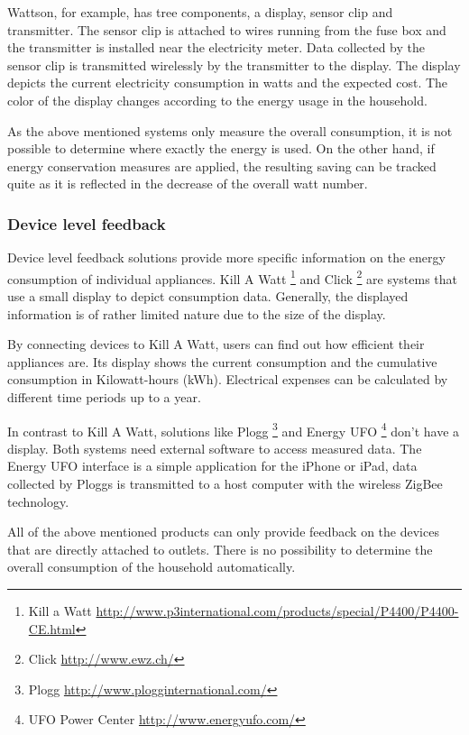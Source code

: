 Wattson, for example, has tree components, a display, sensor clip and transmitter. The sensor clip is attached to wires running from the fuse box and the transmitter is installed near the electricity meter. Data collected by the sensor clip is transmitted wirelessly by the transmitter to the display. The display depicts the current electricity consumption in watts and the expected cost. The color of the display changes according to the energy usage in the household. 

As the above mentioned systems only measure the overall consumption, it is not possible to determine where exactly the energy is used. On the other hand, if energy conservation measures are applied, the resulting saving can be tracked quite as it is reflected in the decrease of the overall watt number.

\subsubsection{Device level feedback}
Device level feedback solutions provide more specific information on the energy consumption of individual appliances. Kill A Watt \footnote{Kill a Watt \url{http://www.p3international.com/products/special/P4400/P4400-CE.html}} and Click \footnote{Click \url{http://www.ewz.ch/}} are systems that use a small display to depict consumption data. Generally, the displayed information is of rather limited nature due to the size of the display.
 
By connecting devices to Kill A Watt, users can find out how efficient their appliances are. Its display shows the current consumption and the cumulative consumption in Kilowatt-hours (kWh). Electrical expenses can be calculated by different time periods up to a year. 

In contrast to Kill A Watt, solutions like Plogg \footnote{Plogg \url{http://www.plogginternational.com/}} and Energy UFO \footnote{UFO Power Center \url{http://www.energyufo.com/}} don't have a display. Both systems need external software to access measured data.
The Energy UFO interface is a simple application for the iPhone or iPad, data collected by Ploggs is transmitted to a host computer with the wireless ZigBee technology.  

All of the above mentioned products can only provide feedback on the devices that are directly attached to outlets. There is no possibility to determine the overall consumption of the household automatically. 

